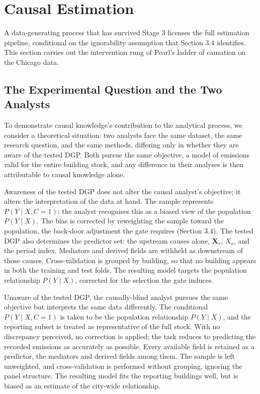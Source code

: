 \FloatBarrier
\section{Causal Estimation}

A data-generating process that has survived Stage 3 licenses the full estimation pipeline, conditional on the ignorability assumption that Section 3.4 identifies. This section carries out the intervention rung of Pearl's ladder of causation on the Chicago data.

\subsection{The Experimental Question and the Two Analysts}

To demonstrate causal knowledge's contribution to the analytical process, we consider a theoretical situation: two analysts face the same dataset, the same research question, and the same methods, differing only in whether they are aware of the tested DGP. Both pursue the same objective, a model of emissions valid for the entire building stock, and any difference in their analyses is then attributable to causal knowledge alone.

Awareness of the tested DGP does not alter the causal analyst's objective; it alters the interpretation of the data at hand. The sample represents $P(Y \mid X, C = 1)$; the analyst recognises this as a biased view of the population $P(Y \mid X)$. The bias is corrected by reweighting the sample toward the population, the back-door adjustment the gate requires (Section 3.4). The tested DGP also determines the predictor set: the upstream causes alone, $\mathbf{X}_s$, $X_o$, and the period index. Mediators and derived fields are withheld as downstream of those causes. Cross-validation is grouped by building, so that no building appears in both the training and test folds. The resulting model targets the population relationship $P(Y \mid X)$, corrected for the selection the gate induces.

Unaware of the tested DGP, the causally-blind analyst pursues the same objective but interprets the same data differently. The conditional $P(Y \mid X, C = 1)$ is taken to be the population relationship $P(Y \mid X)$, and the reporting subset is treated as representative of the full stock. With no discrepancy perceived, no correction is applied; the task reduces to predicting the recorded emissions as accurately as possible. Every available field is retained as a predictor, the mediators and derived fields among them. The sample is left unweighted, and cross-validation is performed without grouping, ignoring the panel structure. The resulting model fits the reporting buildings well, but is biased as an estimate of the city-wide relationship.

